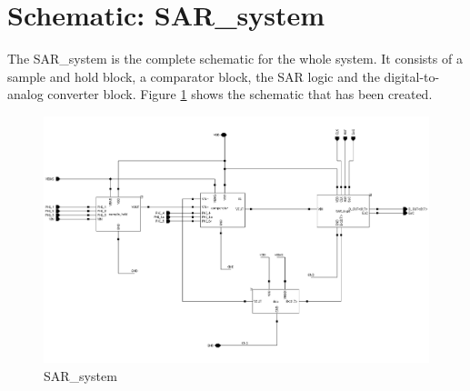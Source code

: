 \documentclass[english, a4paper,11pt]{article}
\begin{document}
\section*{Schematic: SAR\_system}
The SAR\_system is the complete schematic for the whole system. It consists of a sample and hold block, a comparator block, the SAR logic and the digital-to-analog converter block. Figure 
\ref{sar:system} shows the schematic that has been created.\\
\begin{figure}[!ht]
 \centering
   \includegraphics[width=\textwidth]{img/SAR_system}
   \caption{SAR\_system}
   \label{sar:system}
\end{figure}
\end{document}
